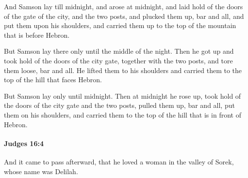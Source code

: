 			\begin{versebox}
					\item[BHS] 
					\item[ASV] And Samson lay till midnight, and arose at midnight, and laid hold of the doors of the gate of the city, and the two posts, and plucked them up, bar and all, and put them upon his shoulders, and carried them up to the top of the mountain that is before Hebron.
					\item[NIV] But Samson lay there only until the middle of the night. Then he got up and took hold of the doors of the city gate, together with the two posts, and tore them loose, bar and all. He lifted them to his shoulders and carried them to the top of the hill that faces Hebron.
					\item[NRSV] But Samson lay only until midnight. Then at midnight he rose up, took hold of the doors of the city gate and the two posts, pulled them up, bar and all, put them on his shoulders, and carried them to the top of the hill that is in front of Hebron.
			\end{versebox}

		\paragraph{Judges 16:4} %
			\label{JUDGES-16-4}

			And it came to pass afterward, that he loved a woman in the valley of Sorek, whose name was Delilah.

